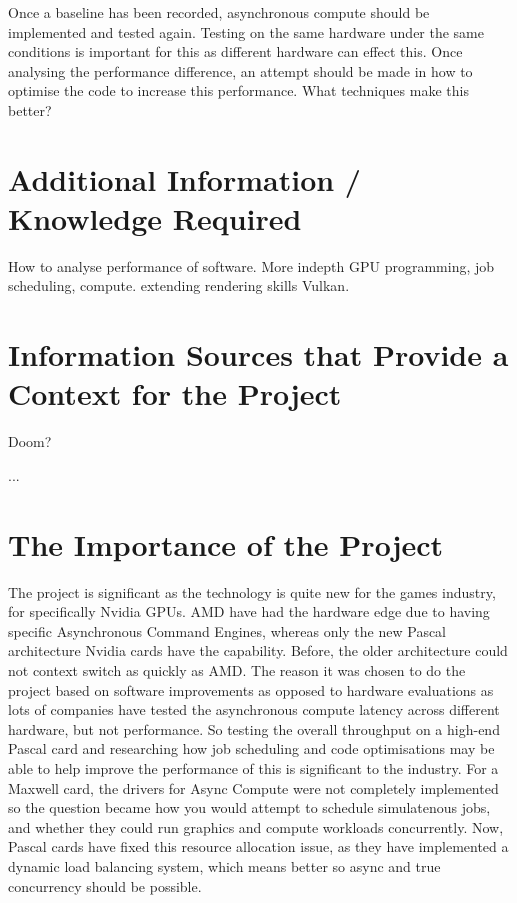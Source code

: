 Once a baseline has been recorded, asynchronous compute should be implemented and tested again. Testing on the same hardware under the same conditions is important for this as different hardware can effect this. Once analysing the performance difference, an attempt should be made in how to optimise the code to increase this performance. What techniques make this better?


\section{Additional Information / Knowledge Required}
How to analyse performance of software. More indepth GPU programming, 
job scheduling, compute.
extending rendering skills
Vulkan.

\section{Information Sources that Provide a Context for the Project}
Doom?

...

\section{The Importance of the Project}

The project is significant as the technology is quite new for the games industry, for specifically Nvidia GPUs. AMD have had the hardware edge due to having specific Asynchronous Command Engines, whereas only the new Pascal architecture Nvidia cards have the capability. Before, the older architecture could not context switch as quickly as AMD. The reason it was chosen to do the project based on software improvements as opposed to hardware evaluations as lots of companies have tested the asynchronous compute latency across different hardware, but not performance. So testing the overall throughput on a high-end Pascal card and researching how job scheduling and code optimisations may be able to help improve the performance of this is significant to the industry. For a Maxwell card, the drivers for Async Compute were not completely implemented so the question became how you would attempt to schedule simulatenous jobs, and whether they could run graphics and compute workloads concurrently. Now, Pascal cards have fixed this resource allocation issue, as they have implemented a dynamic load balancing system, which means better so async and true concurrency should be possible.

